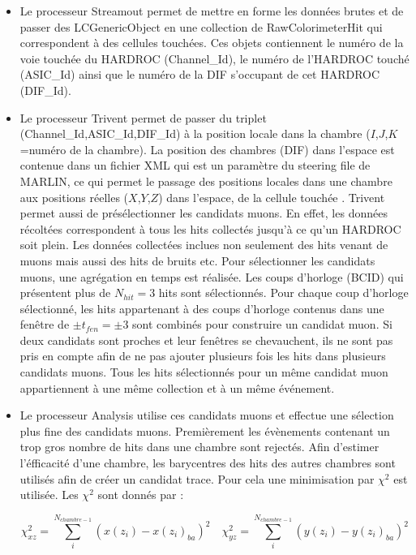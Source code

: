 \begin{itemize}[label=$\bullet$]
	\item Le processeur Streamout permet de mettre en forme les données brutes et de passer des LCGenericObject en une collection de RawColorimeterHit qui correspondent à des cellules touchées. Ces objets contiennent le numéro de la voie touchée du HARDROC (Channel\_Id), le numéro de l'HARDROC touché (ASIC\_Id) ainsi que le numéro de la DIF s'occupant de cet HARDROC (DIF\_Id).
	\item Le processeur Trivent permet de passer du triplet (Channel\_Id,ASIC\_Id,DIF\_Id) à la position locale dans la chambre ($I$,$J$,$K$=numéro de la chambre). La position des chambres (DIF) dans l'espace est contenue dans un fichier XML qui est un paramètre du steering file de MARLIN, ce qui permet le passage des positions locales dans une chambre aux positions réelles ($X$,$Y$,$Z$) dans l'espace, de la cellule touchée . Trivent permet aussi de présélectionner les candidats muons. En effet, les données récoltées correspondent à tous les hits collectés jusqu'à ce qu'un HARDROC soit plein. Les données collectées inclues non seulement des hits venant de muons mais aussi des hits de bruits etc. Pour sélectionner les candidats muons, une agrégation en temps est réalisée. Les coups d'horloge (BCID) qui présentent plus de $N_{hit}=3$ hits sont sélectionnés. Pour chaque coup d'horloge sélectionné, les hits appartenant à des coups d'horloge contenus dans une fenêtre de $\pm t_{fen}=\pm3$ sont combinés pour construire un candidat muon. Si deux candidats sont proches et leur fenêtres se chevauchent, ils ne sont pas pris en compte afin de ne pas ajouter plusieurs fois les hits dans plusieurs candidats muons. Tous les hits sélectionnés pour un même candidat muon appartiennent à une même collection et à un même événement.
	\item Le processeur Analysis utilise ces candidats muons et effectue une sélection plus fine des candidats muons. Premièrement les évènements contenant un trop gros nombre de hits dans une chambre sont rejectés. Afin d'estimer l'éfficacité d'une chambre, les barycentres des hits des autres chambres sont utilisés afin de créer un candidat trace. Pour cela une minimisation par $\chi^2$ est utilisée. Les $\chi^2$ sont donnés par :
	
	\begin{equation}
	\chi_{xz}^2=\sum_i^{N_{chambre-1}}\left(x(z_{i})-x(z_{i})_{ba}\right)^2 \quad \chi_{yz}^2=\sum_i^{N_{chambre-1}}\left(y(z_{i})-y(z_{i})_{ba}\right)^2
	\end{equation}
	

\end{itemize}
